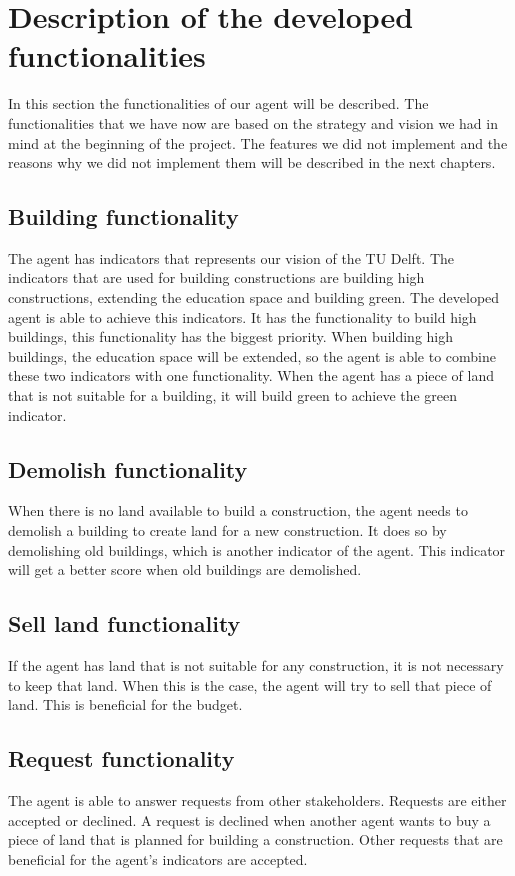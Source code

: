 \chapter{Description of the developed functionalities}
In this section the functionalities of our agent will be described. The functionalities that we have now are based on the strategy and vision we had in mind at the beginning of the project. The features we did not implement and the reasons why we did not implement them will be described in the next chapters. 

\section{Building functionality}
The agent has indicators that represents our vision of the TU Delft. The indicators that are used for building constructions are building high constructions, extending the education space and building green. The developed agent is able to achieve this indicators. It has the functionality to build high buildings, this functionality has the biggest priority. When building high buildings, the education space will be extended, so the agent is able to combine these two indicators with one functionality. When the agent has a piece of land that is not suitable for a building, it will build green to achieve the green indicator.

\section{Demolish functionality}
When there is no land available to build a construction, the agent needs to demolish a building to create land for a new construction. It does so by demolishing old buildings, which is another indicator of the agent. This indicator will get a better score when old buildings are demolished.

\section{Sell land functionality}
If the agent has land that is not suitable for any construction, it is not necessary to keep that land. When this is the case, the agent will try to sell that piece of land. This is beneficial for the budget.

\section{Request functionality}
The agent is able to answer requests from other stakeholders. Requests are either accepted or declined. A request is declined when another agent wants to buy a piece of land that is planned for building a construction. Other requests that are beneficial for the agent’s indicators are accepted.
